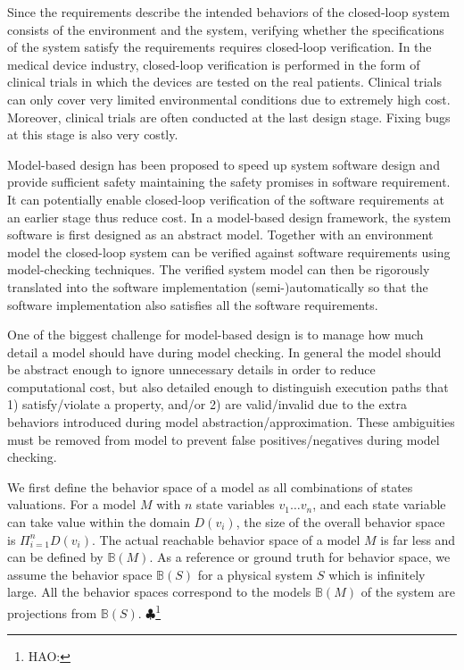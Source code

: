 \documentclass{llncs}
\newcommand{\Hao}[1]{$\clubsuit$\footnote{HAO: #1}}
\begin{document}
Since the requirements describe the intended behaviors of the closed-loop system consists of the environment and the system, verifying whether the specifications of the system satisfy the requirements requires closed-loop verification. In the medical device industry, closed-loop verification is performed in the form of clinical trials in which the devices are tested on the real patients. Clinical trials can only cover very limited environmental conditions due to extremely high cost. Moreover, clinical trials are often conducted at the last design stage. Fixing bugs at this stage is also very costly.

Model-based design has been proposed to speed up system software design and provide sufficient safety maintaining the safety promises in software requirement. It can potentially enable closed-loop verification of the software requirements at an earlier stage thus reduce cost. In a model-based design framework, the system software is first designed as an abstract model. Together with an environment model the closed-loop system can be verified against software requirements using model-checking techniques. The verified system model can then be rigorously translated into the software implementation (semi-)automatically so that the software implementation also satisfies all the software requirements.


One of the biggest challenge for model-based design is to manage how much detail a model should have during model checking. In general the model should be abstract enough to ignore unnecessary details in order to reduce computational cost, but also detailed enough to distinguish execution paths that 1) satisfy/violate a property, and/or 2) are valid/invalid due to the extra behaviors introduced during model abstraction/approximation. These ambiguities must be removed from model to prevent false positives/negatives during model checking. 

We first define the behavior space of a model as all combinations of states valuations. For a model $M$ with $n$ state variables $v_1\dots v_n$, and each state variable can take value within the domain $D(v_i)$, the size of the overall behavior space is $\Pi_{i=1}^n D(v_i)$. The actual reachable behavior space of a model $M$ is far less and can be defined by $\mathbb{B}(M)$. As a reference or ground truth for behavior space, we assume the behavior space $\mathbb{B}(S)$ for a physical system $S$ which is infinitely large. All the behavior spaces correspond to the models $\mathbb{B}(M)$ of the system are projections from $\mathbb{B}(S)$.  
\Hao{}
\end{document}
